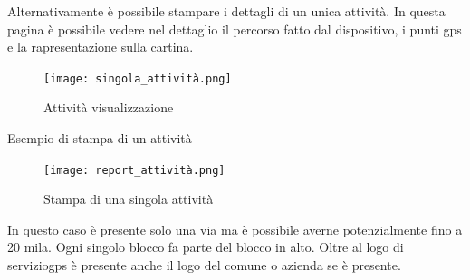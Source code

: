 \documentclass[12pt]{article}
\begin{document}
Alternativamente è possibile stampare i dettagli di un unica attività. 
In questa pagina è possibile vedere nel dettaglio il percorso fatto 
dal dispositivo, i punti gps e la rapresentazione sulla cartina. 
\begin{figure}[H]
\texttt{[image: singola\_attività.png]}
\caption{Attività visualizzazione}
\end{figure}
Esempio di stampa di un attività 
\begin{figure}[H]
\texttt{[image: report\_attività.png]}
\caption{Stampa di una singola attività}
\end{figure}
In questo caso è presente solo una via ma è possibile averne potenzialmente 
fino a 20 mila. Ogni singolo blocco fa parte del blocco in alto.  
Oltre al logo di serviziogps è presente anche il logo del comune o azienda 
se è presente. 
\end{document}
